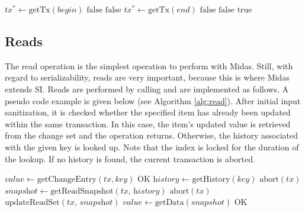 \begin{algorithm}
\begin{algorithmic}[1]
\State $\textit{tx}^{*} \gets \text{getTx}(\textit{begin})$
\State \Return $\text{false}$
\EndIf
\Else
{}
\State \Return $\text{false}$
\EndIf
\EndIf
\State
{}
\State $\textit{tx}^{*} \gets \text{getTx}(\textit{end})$
\State \Return $\text{false}$
\EndIf
\Else
{}
\State \Return $\text{false}$
\EndIf
\EndIf
\State \Return $\text{true}$
\EndProcedure
\end{algorithmic}
\caption{}
\label{alg:vsb}
\end{algorithm}

\vfill

\subsection{Reads}

The read operation is the simplest operation to perform with Midas. Still, with regard to serializability, reads are very important, because this is where Midas extends SI. Reads are performed by calling  and are implemented as follows. A pseudo code example is given below (see Algorithm \ref{alg:read}). After initial input sanitization, it is checked whether the specified item has already been updated within the same transaction. In this case, the item's updated value is retrieved from the change set and the operation returns. Otherwise, the history associated with the given key is looked up. Note that the index is locked for the duration of the lookup. If no history is found, the current transaction is aborted.

\begin{algorithm}[!ht]
\begin{algorithmic}[1]
\State $\textit{value} \gets \text{getChangeEntry}(tx, key)$
\State \Return $\text{OK}$
\EndIf
\State $\textit{history} \gets \text{getHistory}(\textit{key})$
\State \Return $\text{abort}(tx)$
\EndIf
\State $\textit{snapshot} \gets \text{getReadSnapshot}(\textit{tx, history})$
\State \Return $\text{abort}(tx)$
\EndIf
\State $\text{updateReadSet}(\textit{tx, snapshot})$
\State $\textit{value} \gets \text{getData}(snapshot)$
\State \Return $\text{OK}$
\EndProcedure
\end{algorithmic}
\caption{}
\label{alg:read}
\end{algorithm}

